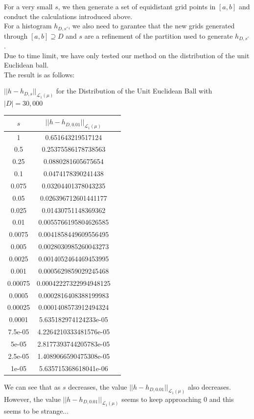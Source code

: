 \documentclass{article}
\begin{document}
For a very small $s$, we then generate a set of equidistant grid points in $[a,b]$ and conduct the calculations introduced above. \\
For a histogram $h_{D,s'}$, we also need to garantee that the new grids generated through $[a,b]\supseteq D$ and $s$ are a refinement of the partition used to generate $h_{D,s'}$. \\
\newpage 
Due to time limit, we have only tested our method on the distribution of the unit Euclidean ball. \\
The result is as follows: 


\begin{center}
$||h-h_{D,s}||_{\mathcal{L}_1(\mu)}$ for the Distribution of the Unit Euclidean Ball with $|D|=30,000$ \vspace*{1em} \\
\begin{tabular}{ccc}

\hline  

$s$  &$||h-h_{D,0.01}||_{\mathcal{L}_1(\mu)}$   \\
\hline  

1    &0.651643219517124\\
0.5    &0.25375586178738563\\
0.25    &0.0880281605675654\\
0.1    &0.0474178390241438\\
0.075    &0.03204401378043235\\
0.05    &0.026396712601441177\\
0.025    &0.01430751148369362\\
0.01    &0.0055766195804626585\\
0.0075    &0.0041858449609556495\\
0.005    &0.0028030985260043273\\
0.0025    &0.0014052464469453995\\
0.001    &0.0005629859029245468\\
0.00075    &0.00042227322994948125\\
0.0005    &0.0002816408388199983\\
0.00025    &0.0001408573912494324\\
0.0001    &5.635182974124233e-05\\
7.5e-05    &4.2264210333481576e-05\\
5e-05    &2.8177393744205783e-05\\
2.5e-05    &1.4089066590475308e-05\\
1e-05    &5.635715368618041e-06\\


\hline 
\end{tabular}

\end{center}

\noindent We can see that as $s$ decreases, the value $||h-h_{D,0.01}||_{\mathcal{L}_1(\mu)}$ also decreases. \\
However, the value $||h-h_{D,0.01}||_{\mathcal{L}_1(\mu)}$ seems to keep approaching 0 and this seems to be strange...
\end{document}
